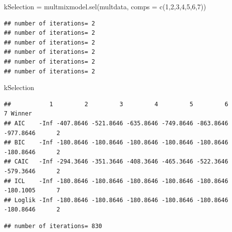 \documentclass[
  ignorenonframetext,
]{beamer}
\newenvironment{Shaded}{\begin{snugshade}}{\end{snugshade}}
\newcommand{\AttributeTok}[1]{\textcolor[rgb]{0.77,0.63,0.00}{#1}}
\newcommand{\CommentTok}[1]{\textcolor[rgb]{0.56,0.35,0.01}{\textit{#1}}}
\newcommand{\DecValTok}[1]{\textcolor[rgb]{0.00,0.00,0.81}{#1}}
\newcommand{\FunctionTok}[1]{\textcolor[rgb]{0.00,0.00,0.00}{#1}}
\newcommand{\NormalTok}[1]{#1}
\newcommand{\OtherTok}[1]{\textcolor[rgb]{0.56,0.35,0.01}{#1}}
\newcommand{\SpecialCharTok}[1]{\textcolor[rgb]{0.00,0.00,0.00}{#1}}
\begin{document}
\begin{frame}[fragile]{}
\begin{Shaded}
\begin{Highlighting}[]
\NormalTok{kSelection }\OtherTok{=} \FunctionTok{multmixmodel.sel}\NormalTok{(multdata,  }\AttributeTok{comps =} \FunctionTok{c}\NormalTok{(}\DecValTok{1}\NormalTok{,}\DecValTok{2}\NormalTok{,}\DecValTok{3}\NormalTok{,}\DecValTok{4}\NormalTok{,}\DecValTok{5}\NormalTok{,}\DecValTok{6}\NormalTok{,}\DecValTok{7}\NormalTok{))}
\end{Highlighting}
\end{Shaded}

\begin{verbatim}
## number of iterations= 2 
## number of iterations= 2 
## number of iterations= 2 
## number of iterations= 2 
## number of iterations= 2 
## number of iterations= 2
\end{verbatim}

\begin{Shaded}
\begin{Highlighting}[]
\NormalTok{kSelection}
\end{Highlighting}
\end{Shaded}

\begin{verbatim}
##           1         2         3         4         5         6         7 Winner
## AIC    -Inf -407.8646 -521.8646 -635.8646 -749.8646 -863.8646 -977.8646      2
## BIC    -Inf -180.8646 -180.8646 -180.8646 -180.8646 -180.8646 -180.8646      2
## CAIC   -Inf -294.3646 -351.3646 -408.3646 -465.3646 -522.3646 -579.3646      2
## ICL    -Inf -180.8646 -180.8646 -180.8646 -180.8646 -180.8646 -180.1005      7
## Loglik -Inf -180.8646 -180.8646 -180.8646 -180.8646 -180.8646 -180.8646      2
\end{verbatim}

\begin{Shaded}
\end{Shaded}

\begin{verbatim}
## number of iterations= 830
\end{verbatim}


\end{frame}
\end{document}
